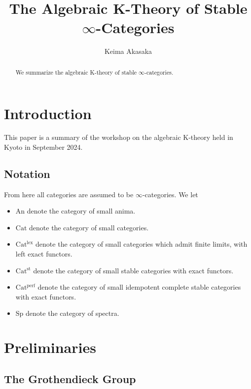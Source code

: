 \documentclass[a4paper,dvipdfmx,11pt,reqno]{amsart}
\newcommand{\An}{\mathrm{An}}
\newcommand{\Cat}{\mathrm{Cat}}
\newcommand{\Catlex}{\mathrm{Cat^{lex}}}
\newcommand{\Catperf}{\mathrm{Cat^{perf}}}
\newcommand{\Catst}{\mathrm{Cat^{st}}}
\newcommand{\Sp}{\mathrm{Sp}}
\theoremstyle{definition}
\begin{document}
\title{The Algebraic K-Theory of Stable \texorpdfstring{$\infty$}{infty}-Categories}
\author{Keima Akasaka}
\maketitle 

\begin{abstract}
  We summarize the algebraic K-theory of stable $\infty$-categories.
\end{abstract} 

\setcounter{tocdepth}{1}
\tableofcontents   


\section{Introduction}

This paper is a summary of the workshop on the algebraic K-theory held in Kyoto in September 2024.

\subsection{Notation}

From here all categories are assumed to be $\infty$-categories.
We let 
\begin{itemize}
  \item $\An$ denote the category of small anima.
  \item $\Cat$ denote the category of small categories.
  \item $\Catlex$ denote the category of small categories which admit finite limits, with left exact functors.
  \item $\Catst$ denote the category of small stable categories with exact functors.
  \item $\Catperf$ denote the category of small idempotent complete stable categories with exact functors.
  \item $\Sp$ denote the category of spectra.
\end{itemize}


\section{Preliminaries} \label{sec.preliminaries}

\subsection{The Grothendieck Group} 
\end{document}
